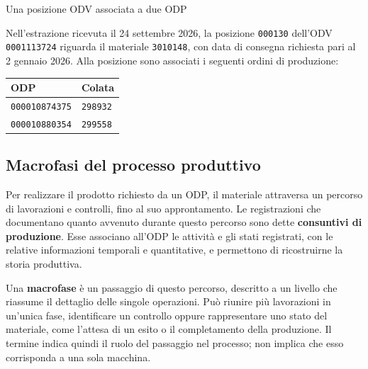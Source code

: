 \begin{examplebox}{Una posizione ODV associata a due ODP}

Nell'estrazione ricevuta il 24 settembre 2026, la posizione \texttt{000130} dell'ODV \texttt{0001113724} riguarda il materiale \texttt{3010148}, con data di consegna richiesta pari al 2 gennaio 2026. Alla posizione sono associati i seguenti ordini di produzione:

\begin{center}
\begin{tabular}{ll}
\toprule
\textbf{ODP} & \textbf{Colata} \\
\midrule
\texttt{000010874375} & \texttt{298932} \\
\texttt{000010880354} & \texttt{299558} \\
\bottomrule
\end{tabular}
\end{center}

\end{examplebox}

\subsection{Macrofasi del processo produttivo}
\label{sec:production-phases}

Per realizzare il prodotto richiesto da un ODP, il materiale attraversa un percorso di lavorazioni e controlli, fino al suo approntamento. Le registrazioni che documentano quanto avvenuto durante questo percorso sono dette \textbf{consuntivi di produzione}. Esse associano all'ODP le attività e gli stati registrati, con le relative informazioni temporali e quantitative, e permettono di ricostruirne la storia produttiva.

Una \textbf{macrofase} è un passaggio di questo percorso, descritto a un livello che riassume il dettaglio delle singole operazioni. Può riunire più lavorazioni in un'unica fase, identificare un controllo oppure rappresentare uno stato del materiale, come l'attesa di un esito o il completamento della produzione. Il termine indica quindi il ruolo del passaggio nel processo; non implica che esso corrisponda a una sola macchina.

